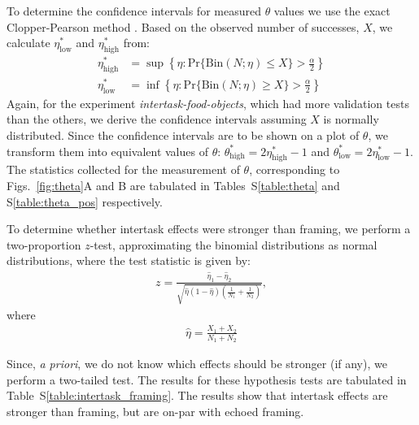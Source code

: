 \documentclass[12pt]{article}
\begin{document}
To determine the confidence intervals for measured $\theta$ values we 
use the exact Clopper-Pearson method \cite{clopper1934use}.  
Based on the observed number of successes, $X$, we calculate 
$\eta^*_\mathrm{low}$ and $\eta^*_\mathrm{high}$ from:
\begin{align}
	\eta^*_\mathrm{high} &= \sup
		\left\{
			\eta : \mathrm{Pr}\{\mathrm{Bin}(N; \eta) \leq X \} > 
				\frac{\alpha}{2}
		\right\} \\
	\eta^*_\mathrm{low} &= \inf
		\left\{
			\eta : \mathrm{Pr}\{\mathrm{Bin}(N; \eta) \geq X \} > 
				\frac{\alpha}{2}
		\right\}
\end{align}
Again, for the experiment \textit{intertask-food-objects}, which had 
more validation tests than the others, we derive the confidence intervals
assuming $X$ is normally distributed.
Since the confidence intervals are to be shown on a plot of $\theta$, we 
transform them into equivalent values of 
$\theta$: $\theta^*_\mathrm{high} = 2\eta^*_\mathrm{high} - 1$ and 
$\theta^*_\mathrm{low} = 2\eta^*_\mathrm{low} - 1$.
The statistics collected for the measurement of $\theta$, corresponding to
Figs.~\ref{fig:theta}A and B are tabulated in Tables~S\ref{table:theta} and
S\ref{table:theta_pos} respectively.

To determine whether intertask effects were stronger than framing, we 
perform a two-proportion $z$-test, approximating the binomial distributions
as normal distributions, where the test statistic is given by:
\begin{align}
	z = \frac{\hat{\eta}_1 - \hat{\eta}_2}
		{\sqrt{
			\hat{\eta} (1 - \hat{\eta}) 
			\left( \frac{1}{N_1} + \frac{1}{N_2}\right)
		}},
\end{align}
where
\begin{align}
	\hat{\eta} = \frac{X_1 + X_2}{N_1 + N_2}
\end{align}


Since, \textit{a priori}, we do not know which effects
should be stronger (if any), we perform a two-tailed test.  The results for 
these hypothesis tests are tabulated in Table~S\ref{table:intertask_framing}.
The results show that intertask effects are stronger than framing, but are
on-par with echoed framing.
\end{document}
